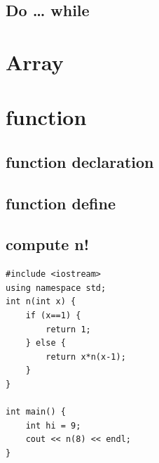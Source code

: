 \documentclass[12pt,a4paper]{article}
\begin{document}
\subsection{Do \ldots{} while}
\label{sec:org83b7f35}

\section{Array}
\label{cpp_arrays}

\section{function}
\label{cpp_functions}
\subsection{function declaration}
\label{sec:orgb78cd4a}

\subsection{function define}
\label{sec:org691a6bc}

\subsection{compute n!}
\label{sec:org45c44fc}
\lstset{breaklines=true,language=C++,label= ,caption= ,captionpos=b,numbers=none}
\begin{lstlisting}
#include <iostream>
using namespace std;
int n(int x) {
    if (x==1) {
        return 1;
    } else {
        return x*n(x-1);
    }
}

int main() {
    int hi = 9;
    cout << n(8) << endl;
}

\end{lstlisting}
\end{document}
